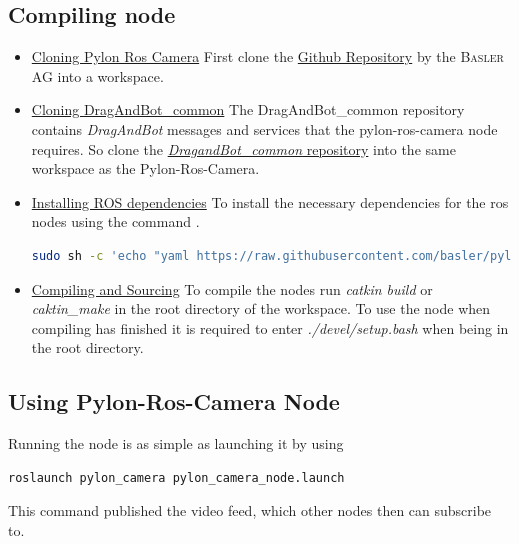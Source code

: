 \subsection{Compiling node}

\begin{itemize}
    \item \underline{Cloning Pylon Ros Camera} \newline
    First clone the \href{https://github.com/basler/pylon-ros-camera}{Github Repository} by the \cite{pylonroscamera} \textsc{Basler AG} into a workspace.
    
    \item \underline{Cloning DragAndBot\_common} \newline
    The DragAndBot\_common repository contains \textit{DragAndBot} messages and services that the pylon-\gls{ros}-camera node requires.
    So clone the \href{https://github.com/dragandbot/dragandbot_common}{\textit{DragandBot\_common} repository} \cite{dragandbotcommon} into the same workspace as the Pylon-Ros-Camera.
    
    \item \underline{Installing ROS dependencies} \newline
    To install the necessary dependencies for the \gls{ros} nodes using the command \cite{code:installdeppylonroscamera}.
    \begin{lstlisting}[language=bash, caption={Installing dependencies for Pylon-Ros-Camera}, label={code:installdeppylonroscamera}]
sudo sh -c 'echo "yaml https://raw.githubusercontent.com/basler/pylon-ros-camera/master/pylon_camera/rosdep/pylon_sdk.yaml" > /etc/ros/rosdep/sources.list.d/30-pylon_camera.list' && rosdep update && sudo rosdep install --from-paths . --ignore-src --rosdistro=$ROS_DISTRO -y
    \end{lstlisting}
    
    \item \underline{Compiling and Sourcing} \newline
    To compile the nodes run \textit{catkin build} or \textit{caktin\_make} in the root directory of the workspace.\newline
    To use the node when compiling has finished it is required to enter \textit{./devel/setup.bash} when being in the root directory.
\end{itemize}

\subsection{Using Pylon-Ros-Camera Node}
Running the node is as simple as launching it by using \newline
\begin{lstlisting}[language=bash]
roslaunch pylon_camera pylon_camera_node.launch
\end{lstlisting}
This command published the video feed, which other nodes then can subscribe to.